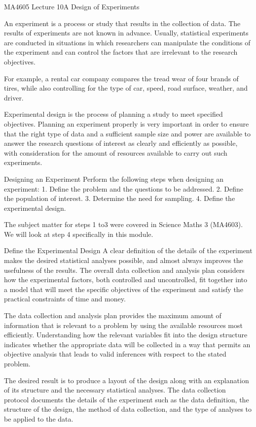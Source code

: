 MA4605 Lecture 10A Design of Experiments 

An experiment is a process or study that results in the collection of data. The results of experiments are not known in advance. Usually, statistical experiments are conducted in situations in which researchers can manipulate the conditions of the experiment and can control the factors that are irrelevant to the research objectives. 

For example, a rental car company compares the tread wear of four brands of tires, while also controlling for the type of car, speed, road surface, weather, and driver.

Experimental design is the process of planning a study to meet specified objectives. Planning an experiment properly is very important in order to ensure that the right type of data and a sufficient sample size and power are available to answer the research questions of interest as clearly and efficiently as possible, with consideration for the amount of resources available to carry out such experiments.


Designing an Experiment
Perform the following steps when designing an experiment:
1. Define the problem and the questions to be addressed.
2. Define the population of interest.
3. Determine the need for sampling.
4. Define the experimental design.

The subject matter for steps 1 to3 were covered in Science Maths 3 (MA4603). We will look at step 4 specifically in this module.

Define the Experimental Design
A clear definition of the details of the experiment makes the desired statistical analyses possible, and almost always improves the usefulness of the results. The overall data collection and analysis plan considers how the experimental factors, both controlled and uncontrolled, fit together into a model that will meet the specific objectives of the experiment and satisfy the practical constraints of time and money.

The data collection and analysis plan provides the maximum amount of information that is relevant to a problem by using the available resources most efficiently. Understanding how the relevant variables fit into the design structure indicates whether the appropriate data will be collected in a way that permits an objective analysis that leads to valid inferences with respect to the stated problem. 



The desired result is to produce a layout of the design along with an explanation of its structure and the necessary statistical analyses. The data collection protocol documents the details of the experiment such as the data definition, the structure of the design, the method of data collection, and the type of analyses to be applied to the data.

